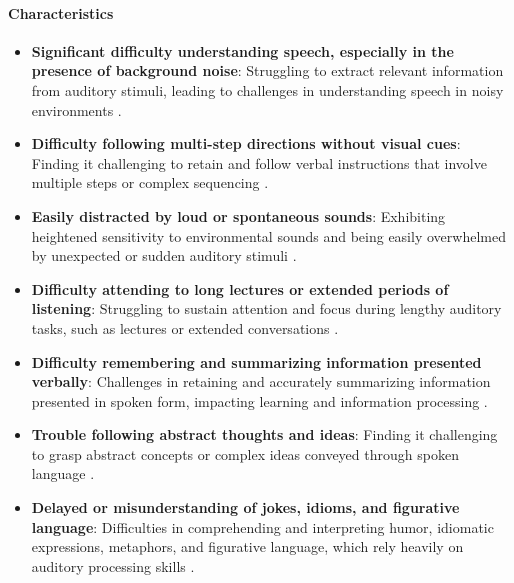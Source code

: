 \paragraph{Characteristics}
\begin{itemize}
    \item \textbf{Significant difficulty understanding speech, especially in the presence of background noise}: Struggling to extract relevant information from auditory stimuli, leading to challenges in understanding speech in noisy environments \cite{Nationwide}.
    \item \textbf{Difficulty following multi-step directions without visual cues}: Finding it challenging to retain and follow verbal instructions that involve multiple steps or complex sequencing \cite{WebMD}.
    \item \textbf{Easily distracted by loud or spontaneous sounds}: Exhibiting heightened sensitivity to environmental sounds and being easily overwhelmed by unexpected or sudden auditory stimuli \cite{Nationwide}.
    \item \textbf{Difficulty attending to long lectures or extended periods of listening}: Struggling to sustain attention and focus during lengthy auditory tasks, such as lectures or extended conversations \cite{Nationwide}.
    \item \textbf{Difficulty remembering and summarizing information presented verbally}: Challenges in retaining and accurately summarizing information presented in spoken form, impacting learning and information processing \cite{Nationwide}.
    \item \textbf{Trouble following abstract thoughts and ideas}: Finding it challenging to grasp abstract concepts or complex ideas conveyed through spoken language \cite{Nationwide}.
    \item \textbf{Delayed or misunderstanding of jokes, idioms, and figurative language}: Difficulties in comprehending and interpreting humor, idiomatic expressions, metaphors, and figurative language, which rely heavily on auditory processing skills \cite{Nationwide}.
\end{itemize}

